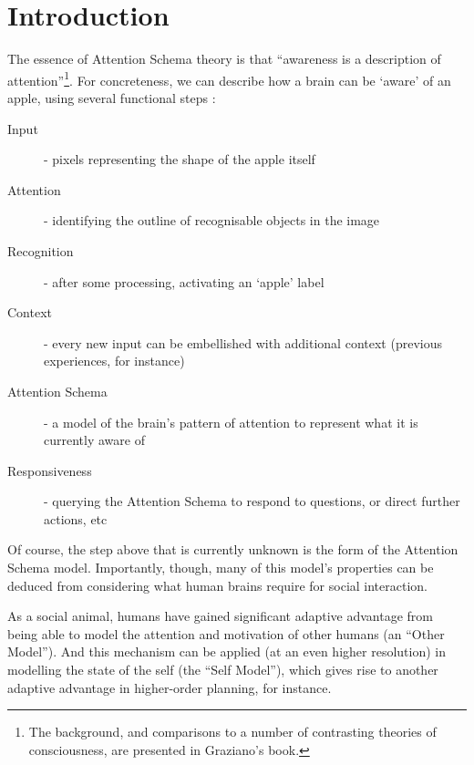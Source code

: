 \documentclass[citeauthoryear]{llncs}
\begin{document}
\section{Introduction}

The essence of Attention Schema theory is that ``awareness is a description of 
attention''\footnote{The background, and comparisons to a number of contrasting theories of consciousness,
are presented in Graziano's \cite{graziano2013consciousness} book.}.
For concreteness, we can describe how a brain can be `aware' of an apple,
using several functional steps :

\begin{description}
\item[Input] - pixels representing the shape of the apple itself
\item[Attention] - identifying the outline of recognisable objects in the image 
\item[Recognition] - after some processing, activating an `apple' label
\item[Context] - every new input can be embellished with additional context (previous experiences, for instance)
\item[Attention Schema] - a model of the brain's pattern of attention to represent what it is currently aware of
\item[Responsiveness] - querying the Attention Schema to respond to questions, or direct further actions, etc
\end{description}

Of course, the step above that is currently unknown is the form of the Attention Schema model.  
Importantly, though, many of this model's properties can be deduced from considering 
what human brains require for social interaction.

As a social animal, humans have gained significant adaptive advantage from 
being able to model the attention and motivation of other humans (an ``Other Model'').  
%
And this mechanism can be applied (at an even higher resolution) in 
modelling the state of the self (the ``Self Model''), which gives rise to another adaptive advantage
in higher-order planning, for instance. 
%



\end{document}
